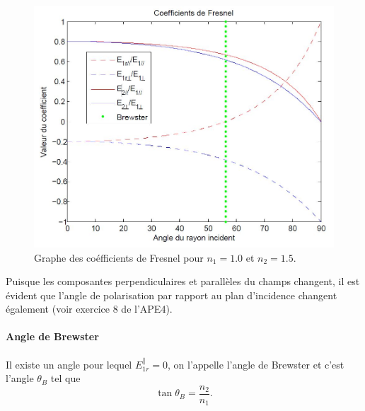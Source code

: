 \begin{figure}[ht]
		\centering
		\includegraphics[scale=0.40]{img/fresnel-1.jpg}
		\caption{Graphe des coéfficients de Fresnel pour $n_1 = 1.0$ et $n_2 = 1.5$.}
		\label{fig:fresnel-1}
\end{figure}

\begin{myrem}
	Puisque les composantes perpendiculaires et parallèles
	du champs changent, il est évident que l'angle de polarisation
	par rapport au plan d'incidence changent également (voir
	exercice 8 de l'APE4).
\end{myrem}

\paragraph{Angle de Brewster}
Il existe un angle pour lequel $E_{1r}^\parallel = 0$,
on l'appelle l'angle de Brewster et c'est l'angle $\theta_B$ tel que
\[ \tan\theta_B = \frac{n_2}{n_1}. \]

